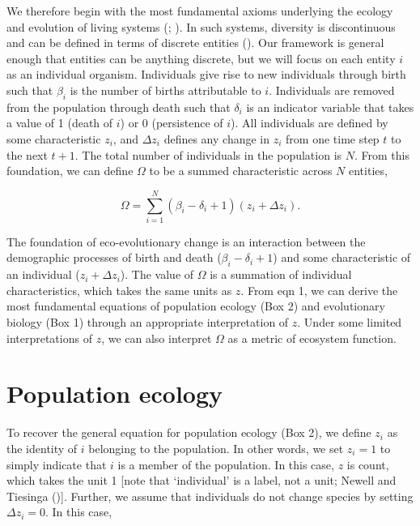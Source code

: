\documentclass[
]{article}
\begin{document}
We therefore begin with the most fundamental axioms underlying the
ecology and evolution of living systems (; ). In such
systems, diversity is discontinuous and can be defined in terms of
discrete entities (). Our
framework is general enough that entities can be anything discrete, but
we will focus on each entity \(i\) as an individual organism.
Individuals give rise to new individuals through birth such that
\(\beta_{i}\) is the number of births attributable to \(i\). Individuals
are removed from the population through death such that \(\delta_{i}\)
is an indicator variable that takes a value of 1 (death of \(i\)) or 0
(persistence of \(i\)). All individuals are defined by some
characteristic \(z_{i}\), and \(\Delta z_{i}\) defines any change in
\(z_{i}\) from one time step \(t\) to the next \(t + 1\). The total
number of individuals in the population is \(N\). From this foundation,
we can define \(\Omega\) to be a summed characteristic across \(N\)
entities,

\[\Omega = \sum_{i=1}^{N} \left(\beta_{i} - \delta_{i} + 1 \right)\left(z_{i} + \Delta z_{i} \right).
\tag{1}
\]

The foundation of eco-evolutionary change is an interaction between the
demographic processes of birth and death
(\(\beta_{i} - \delta_{i} + 1\)) and some characteristic of an
individual (\(z_{i} + \Delta z_{i}\)). The value of \(\Omega\) is a
summation of individual characteristics, which takes the same units as
\(z\). From eqn 1, we can derive the most fundamental equations of
population ecology (Box 2) and evolutionary biology (Box 1) through an
appropriate interpretation of \(z\). Under some limited interpretations
of \(z\), we can also interpret \(\Omega\) as a metric of ecosystem
function.

\section{Population ecology}\label{population-ecology}

To recover the general equation for population ecology (Box 2), we
define \(z_{i}\) as the identity of \(i\) belonging to the population.
In other words, we set \(z_{i} = 1\) to simply indicate that \(i\) is a
member of the population. In this case, \(z\) is count, which takes the
unit 1 {[}note that `individual' is a label, not a unit; Newell and
Tiesinga (){]}. Further, we assume
that individuals do not change species by setting \(\Delta z_{i} = 0\).
In this case,
\end{document}
